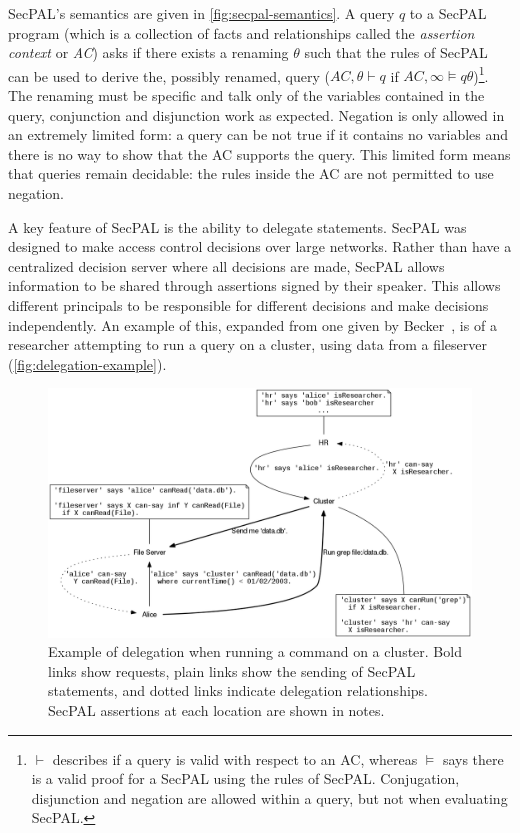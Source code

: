 \documentclass[thesis.tex]{subfiles}
\begin{document}
SecPAL's semantics are given in \autoref{fig:secpal-semantics}.  A
query $q$ to a SecPAL program (which is a collection of facts and
relationships called the \emph{assertion context} or \emph{AC}) asks
if there exists a renaming $\theta$ such that the rules of SecPAL can
be used to derive the, possibly renamed, query ($AC,\theta \vdash q$
if $AC,\infty \models q\theta$)\footnote{$\vdash$ describes if a query
  is valid with respect to an AC, whereas $\models$ says there is a
  valid proof for a SecPAL using the rules of SecPAL.  Conjugation,
  disjunction and negation are allowed within a query, but not when
  evaluating SecPAL.}.  The renaming must be specific and talk only of
the variables contained in the query, conjunction and disjunction work
as expected.  Negation is only allowed in an extremely limited form: a
query can be not true if it contains no variables and there is no way
to show that the AC supports the query.  This limited form means that
queries remain decidable: the rules inside the AC are not permitted to
use negation.

A key feature of SecPAL is the ability to delegate statements.  SecPAL
was designed to make access control decisions over large networks.
Rather than have a centralized decision server where all decisions are
made, SecPAL allows information to be shared through assertions signed
by their speaker.  This allows different principals to be responsible for different decisions and make decisions independently.
An example of this, expanded from one given by Becker~\cite{becker_secpal:_2010}, is of a researcher attempting to run a query on a cluster, using data from a fileserver (\autoref{fig:delegation-example}).

\begin{figure}
  \centering
  \includegraphics[width=\textwidth]{figures/secpal-example.png}
  \caption[Example of delegation on a cluster.]{Example of delegation when running a command on a cluster.  Bold links show requests, plain links show the sending of SecPAL statements, and dotted links indicate delegation relationships.  SecPAL assertions at each location are shown in notes.}
  \label{fig:delegation-example}
\end{figure}
\end{document}
